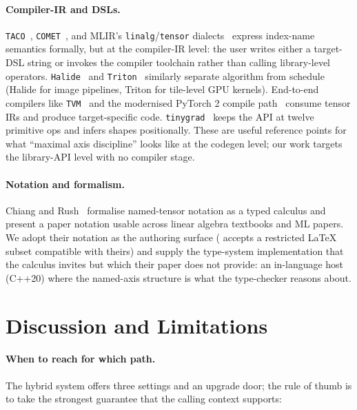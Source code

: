 \documentclass[10pt,twocolumn]{article}
\newcommand{\code}[1]{\texttt{#1}}
\begin{document}
\paragraph{Compiler-IR and DSLs.}
\code{TACO}~\cite{kjolstad2017taco}, \code{COMET}~\cite{comet},
and MLIR's \code{linalg}/\code{tensor}
dialects~\cite{mlir-linalg,lattner2021mlir} express index-name
semantics formally, but at the compiler-IR level: the user writes
either a target-DSL string or invokes the compiler toolchain rather
than calling library-level operators.
\code{Halide}~\cite{ragan-kelley2013halide} and
\code{Triton}~\cite{tillet2019triton} similarly separate algorithm
from schedule (Halide for image pipelines, Triton for tile-level
GPU kernels). End-to-end compilers like
\code{TVM}~\cite{chen2018tvm} and the modernised PyTorch 2
compile path~\cite{ansel2024pytorch2} consume tensor IRs and
produce target-specific code.
\code{tinygrad}~\cite{tinygrad} keeps the API at twelve primitive
ops and infers shapes positionally. These are useful reference points for what
``maximal axis discipline'' looks like at the codegen level; our
work targets the library-API level with no compiler stage.

\paragraph{Notation and formalism.}
Chiang and Rush~\cite{chiang2024named} formalise named-tensor
notation as a typed calculus and present a paper notation usable
across linear algebra textbooks and ML papers. We adopt their
notation as the authoring surface ( accepts a
restricted LaTeX subset compatible with theirs) and supply the
type-system implementation that the calculus invites but which their
paper does not provide: an in-language host (C++20) where the
named-axis structure is what the type-checker reasons about.

\section{Discussion and Limitations}
\label{sec:discussion}


\paragraph{When to reach for which path.}
The hybrid system offers three settings and an upgrade door; the
rule of thumb is to take the strongest guarantee that the calling
context supports:
\end{document}
